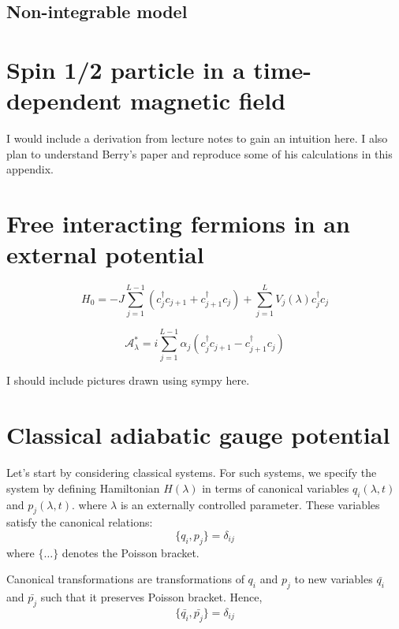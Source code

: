 \documentclass[11pt,a4paper]{article}
\begin{document}
\subsection{Non-integrable model}

\appendix

\section{Spin 1/2 particle in a time-dependent magnetic field}
I would include a derivation from lecture notes to gain an intuition here. I also plan to understand Berry's paper and reproduce some of his calculations in this appendix.

\section{Free interacting fermions in an external potential}

\begin{equation}
H_0= -J \sum_{j=1}^{L-1} (c^{\dagger}_j c_{j+1} +c^{\dagger}_{j+1} c_{j}) + \sum_{j=1}^{L} V_j(\lambda) c^{\dagger}_jc_j
\end{equation}


\begin{equation}
\mathcal{A}^*_{\lambda}= i  \sum_{j=1}^{L-1} \alpha_j (c^{\dagger}_j c_{j+1} - c^{\dagger}_{j+1} c_{j}) 
\end{equation}

I should include pictures drawn using sympy here.


\section{Classical adiabatic gauge potential}
Let's start by considering classical systems. For such systems, we specify the system by defining Hamiltonian $H (\lambda)$ in terms of canonical variables $q_i (\lambda,t)$ and $p_j (\lambda,t)$. where $\lambda$ is an externally controlled parameter. These variables satisfy the canonical relations:
\begin{equation}
\{q_i,p_j \}=\delta_{ij} 
\end{equation}
where $\{\ldots \}$ denotes the Poisson bracket.

Canonical transformations are transformations of $q_i$ and $p_j$ to new variables $\bar{q_i}$ and $\bar{p_j}$ such that it preserves Poisson bracket. Hence, 
\begin{equation}
\{\bar{q_i},\bar{p_j} \}=\delta_{ij} 
\end{equation}
\end{document}
